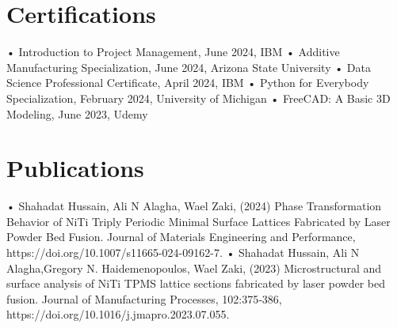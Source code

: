 \documentclass[a4paper]{article}
\begin{document}
\section*{Certifications}
• Introduction to Project Management, June 2024, IBM
• Additive Manufacturing Specialization, June 2024, Arizona State University
• Data Science Professional Certificate, April 2024, IBM
• Python for Everybody Specialization, February 2024, University of Michigan
• FreeCAD: A Basic 3D Modeling, June 2023, Udemy

\section*{Publications}
• Shahadat Hussain, Ali N Alagha, Wael Zaki, (2024) Phase Transformation Behavior of NiTi Triply Periodic Minimal
Surface Lattices Fabricated by Laser Powder Bed Fusion. Journal of Materials Engineering and Performance,\\
https://doi.org/10.1007/s11665-024-09162-7.
• Shahadat Hussain, Ali N Alagha,Gregory N. Haidemenopoulos, Wael Zaki, (2023) Microstructural and surface
analysis of NiTi TPMS lattice sections fabricated by laser powder bed fusion. Journal of Manufacturing Processes,
102:375‑386,\\
https://doi.org/10.1016/j.jmapro.2023.07.055.
\end{document}
